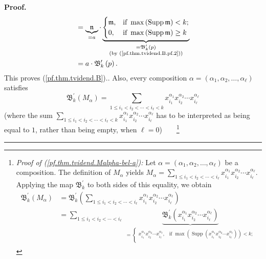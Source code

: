 \documentclass[numbers=enddot,12pt,final,onecolumn,notitlepage,abstracton]{scrartcl}%
\theoremstyle{definition}
\newenvironment{proof}[1][Proof]{\noindent\textbf{#1.} }{\ \rule{0.5em}{0.5em}}
\newenvironment{verlong}{}{}
\let\sumnonlimits\sum
\renewcommand{\sum}{\sumnonlimits\limits}
\begin{document}
\begin{verlong}
\begin{proof}
{\begin{align*}
&  =\underbrace{\mathfrak{n}}_{=a}\cdot\underbrace{
\begin{cases}
\mathfrak{m}, & \text{if }\max\left(  \operatorname*{Supp}\mathfrak{m}\right)
<k;\\
0, & \text{if }\max\left(  \operatorname*{Supp}\mathfrak{m}\right)  \geq k
\end{cases}
}_{\substack{=\mathfrak{B}_{k}^{\prime}\left(  p\right)  \\\text{(by
(\ref{pf.thm.tvidend.B.pf.2}))}}}\\
&  =a\cdot\mathfrak{B}_{k}^{\prime}\left(  p\right)  .
\end{align*}
This proves (\ref{pf.thm.tvidend.B}).}. Also, every composition $\alpha
=\left(  \alpha_{1},\alpha_{2},\ldots,\alpha_{\ell}\right)  $ satisfies%
\begin{equation}
\mathfrak{B}_{k}^{\prime}\left(  M_{\alpha}\right)  =\sum_{1\leq i_{1}%
<i_{2}<\cdots<i_{\ell}<k}x_{i_{1}}^{\alpha_{1}}x_{i_{2}}^{\alpha_{2}}\cdots
x_{i_{\ell}}^{\alpha_{\ell}} \label{pf.thm.tvidend.Malpha-bel-a}%
\end{equation}
(where the sum $\sum_{1\leq i_{1}<i_{2}<\cdots<i_{\ell}<k}x_{i_{1}}%
^{\alpha_{1}}x_{i_{2}}^{\alpha_{2}}\cdots x_{i_{\ell}}^{\alpha_{\ell}}$ has to
be interpreted as being equal to $1$, rather than being empty, when $\ell
=0$)\ \ \ \ \footnote{\textit{Proof of (\ref{pf.thm.tvidend.Malpha-bel-a}):}
Let $\alpha=\left(  \alpha_{1},\alpha_{2},\ldots,\alpha_{\ell}\right)  $ be a
composition. The definition of $M_{\alpha}$ yields $M_{\alpha}=\sum_{1\leq
i_{1}<i_{2}<\cdots<i_{\ell}}x_{i_{1}}^{\alpha_{1}}x_{i_{2}}^{\alpha_{2}}\cdots
x_{i_{\ell}}^{\alpha_{\ell}}$. Applying the map $\mathfrak{B}_{k}^{\prime}$ to
both sides of this equality, we obtain%
\begin{align*}
\mathfrak{B}_{k}^{\prime}\left(  M_{\alpha}\right)   &  =\mathfrak{B}%
_{k}^{\prime}\left(  \sum_{1\leq i_{1}<i_{2}<\cdots<i_{\ell}}x_{i_{1}}%
^{\alpha_{1}}x_{i_{2}}^{\alpha_{2}}\cdots x_{i_{\ell}}^{\alpha_{\ell}}\right)
\\
&  =\sum_{1\leq i_{1}<i_{2}<\cdots<i_{\ell}}\underbrace{\mathfrak{B}%
_{k}^{\prime}\left(  x_{i_{1}}^{\alpha_{1}}x_{i_{2}}^{\alpha_{2}}\cdots
x_{i_{\ell}}^{\alpha_{\ell}}\right)  }_{\substack{=
\begin{cases}
x_{i_{1}}^{\alpha_{1}}x_{i_{2}}^{\alpha_{2}}\cdots x_{i_{\ell}}^{\alpha_{\ell
}}, & \text{if }\max\left(  \operatorname*{Supp}\left(  x_{i_{1}}^{\alpha_{1}%
}x_{i_{2}}^{\alpha_{2}}\cdots x_{i_{\ell}}^{\alpha_{\ell}}\right)  \right)
<k;\\

\end{cases}}}
\end{align*}}
\end{proof}
\end{verlong}
\end{document}
